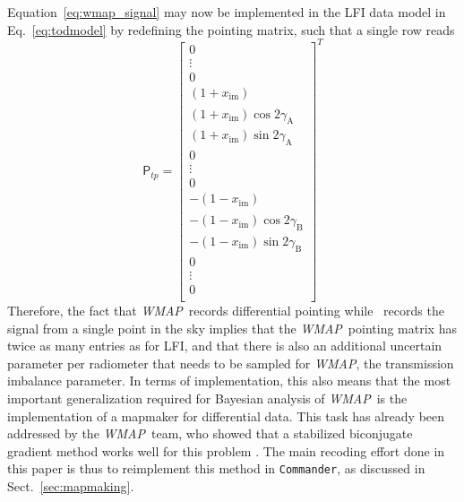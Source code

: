 \documentclass[twocolumn]{aa}
\def\WMAP{\emph{WMAP}}
\def\commander{\texttt{Commander}}
\newcommand{\A}[0]{\mathrm{A}}
\newcommand{\B}[0]{\mathrm{B}}
\begin{document}
Equation~\eqref{eq:wmap_signal} may now be implemented in the LFI data
model in Eq.~\eqref{eq:todmodel} by redefining the pointing
matrix, such that a single row reads
\begin{equation}
  \mathsf P_{tp}=
  \left[
    \begin{array}{c}
      0\\
      \vdots\\
      0\\
      (1+x_{\mathrm{im}})\phantom{\cos2\gamma_\A}\\
      (1+x_{\mathrm{im}})\cos2\gamma_\A\\
      (1+x_{\mathrm{im}})\sin2\gamma_\A\\
      0\\
      \vdots\\
      0\\
	  -(1-x_{\mathrm{im}})\phantom{\cos2\gamma_\A}\\
          -(1-x_{\mathrm{im}})\cos2\gamma_\B\\
          -(1-x_{\mathrm{im}})\sin2\gamma_\B\\
          0\\
          \vdots\\
          0\\
    \end{array}
    \right]^T  
\end{equation}
Therefore, the fact that \WMAP\ records differential pointing while \Planck\
records the signal from a single point in the sky implies that the \WMAP\
pointing matrix has twice as many entries as for LFI, and that there is also an
additional uncertain parameter per radiometer that needs to be sampled for
\WMAP, the transmission imbalance parameter. In terms of implementation, this
also means that the most important generalization required for Bayesian
analysis of \WMAP\ is the implementation of a mapmaker for differential data. This
task has already been addressed by the \WMAP\ team, who showed that a
stabilized biconjugate gradient method works well for this problem
\citep{jarosik2010}. The main recoding effort done in this paper is thus to
reimplement this method in \commander, as discussed in
Sect.~\ref{sec:mapmaking}. 
\end{document}
